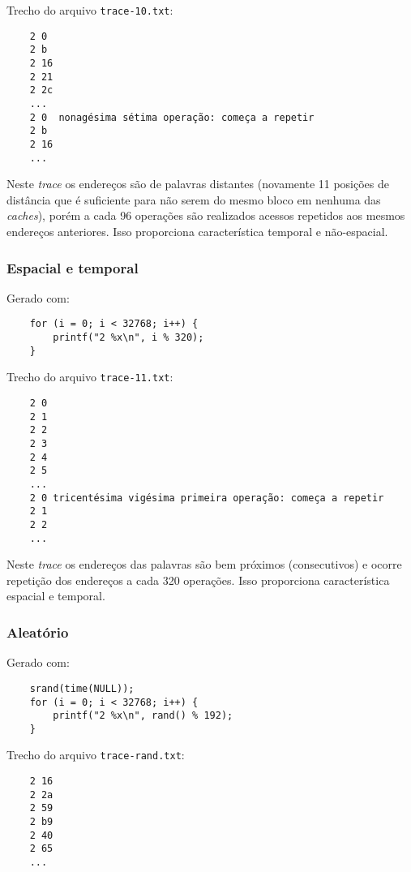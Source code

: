 Trecho do arquivo \texttt{trace-10.txt}:

\begin{verbatim}
    2 0
    2 b
    2 16
    2 21
    2 2c
    ...
    2 0  nonagésima sétima operação: começa a repetir
    2 b
    2 16
    ...
\end{verbatim}

Neste \textit{trace} os endereços são de palavras distantes (novamente 11 posições de distância que é suficiente para não serem do mesmo bloco em nenhuma das \textit{caches}), porém a cada 96 operações são realizados acessos repetidos aos mesmos endereços anteriores. Isso proporciona característica temporal e não-espacial.

\subsubsection{Espacial e temporal}

Gerado com:
\begin{verbatim}
    for (i = 0; i < 32768; i++) {
        printf("2 %x\n", i % 320);
    }
\end{verbatim}

Trecho do arquivo \texttt{trace-11.txt}:

\begin{verbatim}
    2 0
    2 1
    2 2
    2 3
    2 4
    2 5
    ...
    2 0 tricentésima vigésima primeira operação: começa a repetir
    2 1
    2 2
    ...
\end{verbatim}

Neste \textit{trace} os endereços das palavras são bem próximos (consecutivos) e ocorre repetição dos endereços a cada 320 operações. Isso proporciona característica espacial e temporal.

\subsubsection{Aleatório}

Gerado com:
\begin{verbatim}
    srand(time(NULL));
    for (i = 0; i < 32768; i++) {
        printf("2 %x\n", rand() % 192);
    }
\end{verbatim}

Trecho do arquivo \texttt{trace-rand.txt}:

\begin{verbatim}
    2 16
    2 2a
    2 59
    2 b9
    2 40
    2 65
    ...
\end{verbatim}

